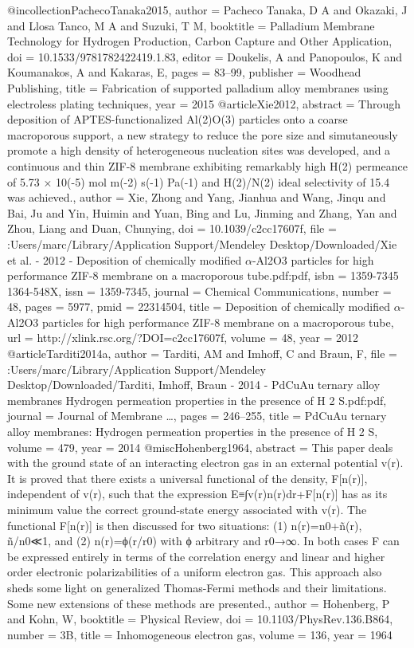@incollection{PachecoTanaka2015,
author = {{Pacheco Tanaka}, D A and Okazaki, J and {Llosa Tanco}, M A and Suzuki, T M},
booktitle = {Palladium Membrane Technology for Hydrogen Production, Carbon Capture and Other Application},
doi = {10.1533/9781782422419.1.83},
editor = {Doukelis, A and Panopoulos, K and Koumanakos, A and Kakaras, E},
pages = {83--99},
publisher = {Woodhead Publishing},
title = {{Fabrication of supported palladium alloy membranes using electroless plating techniques}},
year = {2015}
}
@article{Xie2012,
abstract = {Through deposition of APTES-functionalized Al(2)O(3) particles onto a coarse macroporous support, a new strategy to reduce the pore size and simutaneously promote a high density of heterogeneous nucleation sites was developed, and a continuous and thin ZIF-8 membrane exhibiting remarkably high H(2) permeance of 5.73 × 10(-5) mol m(-2) s(-1) Pa(-1) and H(2)/N(2) ideal selectivity of 15.4 was achieved.},
author = {Xie, Zhong and Yang, Jianhua and Wang, Jinqu and Bai, Ju and Yin, Huimin and Yuan, Bing and Lu, Jinming and Zhang, Yan and Zhou, Liang and Duan, Chunying},
doi = {10.1039/c2cc17607f},
file = {:Users/marc/Library/Application Support/Mendeley Desktop/Downloaded/Xie et al. - 2012 - Deposition of chemically modified $\alpha$-Al2O3 particles for high performance ZIF-8 membrane on a macroporous tube.pdf:pdf},
isbn = {1359-7345 1364-548X},
issn = {1359-7345},
journal = {Chemical Communications},
number = {48},
pages = {5977},
pmid = {22314504},
title = {{Deposition of chemically modified $\alpha$-Al2O3 particles for high performance ZIF-8 membrane on a macroporous tube}},
url = {http://xlink.rsc.org/?DOI=c2cc17607f},
volume = {48},
year = {2012}
}
@article{Tarditi2014a,
author = {Tarditi, AM and Imhoff, C and Braun, F},
file = {:Users/marc/Library/Application Support/Mendeley Desktop/Downloaded/Tarditi, Imhoff, Braun - 2014 - PdCuAu ternary alloy membranes Hydrogen permeation properties in the presence of H 2 S.pdf:pdf},
journal = {Journal of Membrane  {\ldots}},
pages = {246--255},
title = {{PdCuAu ternary alloy membranes: Hydrogen permeation properties in the presence of H 2 S}},
volume = {479},
year = {2014}
}
@misc{Hohenberg1964,
abstract = {This paper deals with the ground state of an interacting electron gas in an external potential v(r). It is proved that there exists a universal functional of the density, F[n(r)], independent of v(r), such that the expression E≡∫v(r)n(r)dr+F[n(r)] has as its minimum value the correct ground-state energy associated with v(r). The functional F[n(r)] is then discussed for two situations: (1) n(r)=n0+ñ(r), ñ/n0≪1, and (2) n(r)=ϕ(r/r0) with ϕ arbitrary and r0→∞. In both cases F can be expressed entirely in terms of the correlation energy and linear and higher order electronic polarizabilities of a uniform electron gas. This approach also sheds some light on generalized Thomas-Fermi methods and their limitations. Some new extensions of these methods are presented.},
author = {Hohenberg, P and Kohn, W},
booktitle = {Physical Review},
doi = {10.1103/PhysRev.136.B864},
number = {3B},
title = {{Inhomogeneous electron gas}},
volume = {136},
year = {1964}
}
